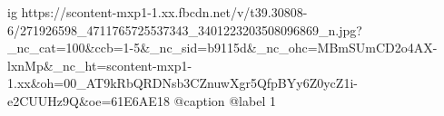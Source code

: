  
 
 
 
 

\ifcmt
  ig https://scontent-mxp1-1.xx.fbcdn.net/v/t39.30808-6/271926598_4711765725537343_3401223203508096869_n.jpg?_nc_cat=100&ccb=1-5&_nc_sid=b9115d&_nc_ohc=MBmSUmCD2o4AX-lxnMp&_nc_ht=scontent-mxp1-1.xx&oh=00_AT9kRbQRDNsb3CZnuwXgr5QfpBYy6Z0ycZ1i-e2CUUHz9Q&oe=61E6AE18
  @caption @label 1
\fi
